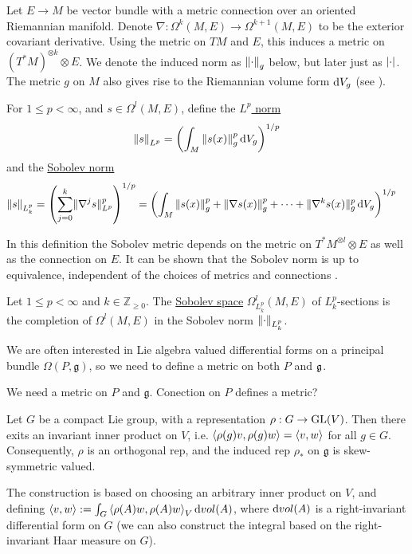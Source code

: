Let $E\to M$ be vector bundle with a metric connection over an oriented 
Riemannian manifold. 
Denote $\nabla : \Omega^k(M,E) \to \Omega^{k+1}(M,E)$ to be the exterior
covariant derivative. Using the metric on $TM$ and  $E$, this induces a
metric on  $(T^*M)^{\otimes k}\otimes E$. We denote the induced norm as 
$\norm{\cdot}_g$ below, but later just as $\abs{\cdot}$.
The metric $g$ on $M$ also gives rise to the Riemannian volume form $\odif{V}_g$
(see \cite[Prop 2.41]{riemannian_manifolds}).
\begin{defn}
    For $1 \leq p < \infty$, and $s \in \Omega^l(M,E)$, 
	define the \underline{$L^p$ norm}
	\[
		 \norm{s}_{L^p} = \paren{\int_M \norm{s(x)}^p_g \odif{V}_g}^{1 /p}
	\] 
	and the \underline{Sobolev norm}
	\begin{align*}
		\norm{s}_{L^p_k} 
		&= \paren{\sum_{j=0}^{k} \norm[*]{\nabla^j s}_{L^p}^p }^{1 /p} 
		= \paren{ \int_M \norm{s(x)}^p_g + \norm{\nabla s(x)}^p_g + \cdots
		+ \norm[*]{\nabla^k s(x)}^p_g \odif{V}_g}^{1 /p} 
	\end{align*}
\end{defn}
In this definition the Sobolev metric depends on the metric on $T^*M^{\otimes
l}\otimes E$ as well as the connection on $E$. It can be shown that the Sobolev
norm is up to equivalence, independent of the choices of metrics and connections
\cite[Lemma 11.22]{math_for_physics}.
\begin{defn}
	Let $1\leq p < \infty$ and  $k\in \mathbb{Z}_{\geq 0}$. The
	\underline{Sobolev
	space} $\Omega^l_{L^p_k}(M,E)$ of $L^p_k$-sections is the completion of
	$\Omega^l(M,E)$ in the Sobolev norm  $\norm{\cdot}_{L^p_k}$.
\end{defn}

We are often interested in Lie algebra valued differential forms on a
principal bundle $\Omega(P,\mathfrak{g})$, so we need to define a metric on both 
$P$ and $\operatorname{\mathfrak{g}}$.

We need a metric on $P$ and  $\mathfrak{g}$. Conection on $P$ defines a metric?


\begin{thm}
	Let $G$ be a compact Lie group, with a representation  $\rho : G \to\operatorname{GL}(V)$.
	Then there exits an invariant inner product on  $V$, i.e. 
	$\gen{\rho(g)v,\rho(g)w} = \gen{v,w}$ for all $g\in G$. Consequently,
	$\rho$ is an orthogonal rep, and the induced rep $\rho_*$ on
	$\mathfrak{g}$ is skew-symmetric valued. 
\end{thm}
The construction is based on choosing an arbitrary inner product on $V$, and
defining $\gen{v,w} := \int_G \gen{\rho(A)w,\rho(A)w}_V \odif{vol}(A)$, where
$\odif{vol}(A)$ is a right-invariant differential form on $G$ (we can also
construct the integral based on the right-invariant Haar measure on $G$).


